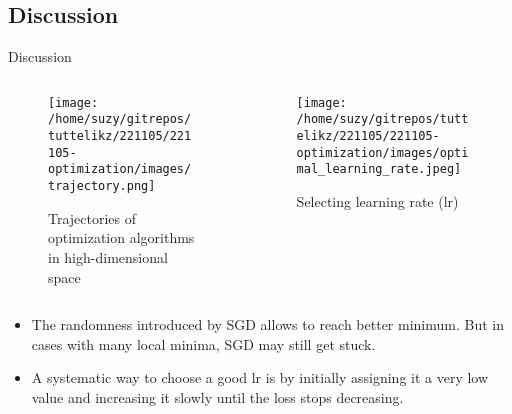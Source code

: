 \documentclass{beamer}
\begin{document}
    \subsection{Discussion}
    \begin{frame}{Discussion}  
      \begin{columns}
        \begin{column}{0.5\textwidth}  %
          \begin{figure}[htb]
            \begin{center}
              \texttt{[image: /home/suzy/gitrepos/tuttelikz/221105/221105-optimization/images/trajectory.png]}
              \caption{Trajectories of optimization algorithms in high-dimensional space~\cite{ruder2016overview}}
            \end{center}
          \end{figure}
        \end{column}
        \begin{column}{0.5\textwidth}  %
          \begin{figure}[htb]
            \begin{center}
              \texttt{[image: /home/suzy/gitrepos/tuttelikz/221105/221105-optimization/images/optimal\_learning\_rate.jpeg]}
              \caption{Selecting learning rate (lr)~\cite{mohanty_2019}}
            \end{center}
          \end{figure}
        \end{column}
    \end{columns}
      \begin{itemize}
        \item The randomness introduced by SGD allows to reach better minimum. But in cases with many local minima, SGD may still get stuck.
        \item A systematic way to choose a good lr is by initially assigning it a very low value and increasing it slowly until the loss stops decreasing.
      \end{itemize}

    \end{frame}
\end{document}
